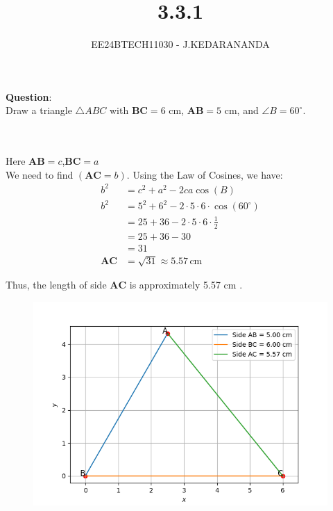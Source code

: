 \documentclass[journal]{IEEEtran}
\begin{document}

\vspace{3cm}

\title{3.3.1}
\author{EE24BTECH11030 - J.KEDARANANDA}
{\let\newpage\relax\maketitle}

\renewcommand{\thefigure}{\theenumi}
\renewcommand{\thetable}{\theenumi}
\setlength{\intextsep}{10pt} %


\renewcommand{\thetable}{\theenumi}


\textbf{Question}:\\
Draw a triangle $\triangle ABC$ with $\boldsymbol{BC} = 6 \text{ cm}$, $\boldsymbol{AB} = 5 \text{ cm}$, and $\angle B = 60^\circ$.
\\ \solution \\
    \begin{table}[h!]    
      \centering
      
      \caption{}
    \end{table}\\
Here $\boldsymbol{AB}=c$,$\boldsymbol{BC}=a$\\
We need to find $(\boldsymbol{AC} = b)$. Using the Law of Cosines, we have:
\begin{align}
    b^2 &= c^2 + a^2 - 2ca \cos(B) \\
    b^2 &= 5^2 + 6^2 - 2 \cdot 5 \cdot 6 \cdot \cos(60^\circ) \\
    &= 25 + 36 - 2 \cdot 5 \cdot 6 \cdot \frac{1}{2} \\
    &= 25 + 36 - 30 \\
    &= 31 \\
    \boldsymbol{AC} &= \sqrt{31} \approx 5.57 \, \text{cm}
\end{align}

Thus, the length of side  $\boldsymbol{AC}$  is approximately 5.57  $\text{cm}$ .

    \begin{figure}[h]
       \centering
       \includegraphics[width=\linewidth]{figs/fig1.png}
       \caption{}
       \label{graph}
    \end{figure}
\end{document}
